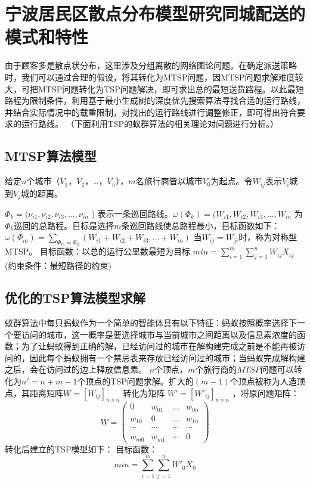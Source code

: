 \clearpage
\section{宁波居民区散点分布模型研究同城配送的模式和特性}
由于顾客多是散点状分布，这里涉及分组离散的网络图论问题。在确定派送策略时，我们可以通过合理的假设，将其转化为MTSP问题，因MTSP问题求解难度较大，可把MTSP问题转化为TSP问题解决，即可求出总的最短送货路程。以此最短路程为限制条件，利用基于最小生成树的深度优先搜索算法寻找合适的运行路线，并结合实际情况中的载重限制，对找出的运行路线进行调整修正，即可得出符合要求的运行路线。 
（下面利用TSP的蚁群算法的相关理论对问题进行分析。）

\subsection{MTSP算法模型}
给定$n$个城市（$V_1$，$V_2$，…，$V_n$），$m$名旅行商皆以城市$V_0$为起点。令$W_{ij}$表示$V_i$城到$V_j$城的距离。

 $\Phi_{k}=(\nu_{i1},\nu_{i2},\nu_{i3},...,\nu_{in}$ ) 表示一条巡回路线。$\omega  (\Phi_{k})=(W_{i1},W_{i2},W_{i3},...,W_{in}$ 为$\Phi_{k}$巡回的总路程。目标是选择$m$条巡回路线使总路程最小，目标函数如下： 
 $\omega (\Phi _{m} )=\sum_{\Phi _{m}=\Phi _{k}}^{}(W_{i1}+W_{i2}+W_{i3},...+W_{in} )$
当$W_{ij}=W_{ji}$时，称为对称型MTSP。 
目标函数：以总的运行公里数最短为目标 
$min=\sum_{i=1}^{m} \sum_{j=1}^{n}W_{ij}X_{ij} $
(约束条件：最短路径的约束)

\subsection{优化的TSP算法模型求解}
\par 蚁群算法中每只蚂蚁作为一个简单的智能体具有以下特征：蚂蚁按照概率选择下一个要访问的城市，这一概率是要选择城市与当前城市之间距离以及信息素浓度的函数；为了让蚂蚁得到正确的解，已经访问过的城市在解构建完成之前是不能再被访问的，因此每个蚂蚁拥有一个禁忌表来存放已经访问过的城市；当蚂蚁完成解构建之后，会在访问过的边上释放信息素。
$n$个顶点，$m$个旅行商的$MTSP$问题可以转化为$n'=n+m-1$个顶点的TSP问题求解。扩大的$(m-1)$个顶点被称为人造顶点，其距离矩阵$W=\left [ W_{ij}  \right ]_{n\times n}$ 
转化为矩阵
$W'=\left [ W'_{ij}  \right ]_{n\times n}$
，将原问题矩阵：
\begin{equation} 
 W=\left(\begin{array} {cccc}
 0 & w_{01} & \ldots & w_{0 n} \\
 w_{10} & 0 & \ldots & w_{1 n} \\
 \cdots  & \cdots & \cdots  & \cdots  \\
 w_{m 0} & w_{m 1} & \cdots  & 0
 \end{array}
 \right)
 \end{equation} 
转化后建立的TSP模型如下：
目标函数：
\begin{equation} 
 min=\sum_{i=1}^{m}\sum_{j=1}^{n}W'_{0}X_{0}    
 \end{equation}

